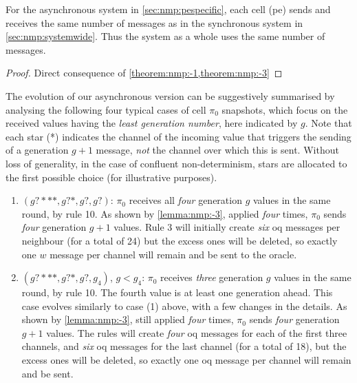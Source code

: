 \begin{theorem}\label{theorem:nmp:-4}
    For the asynchronous system in \cref{sec:nmp:pespecific}, 
    each cell (\gls{pe}) sends and receives the same number of messages as in the synchronous system in \cref{sec:nmp:systemwide}.   
    Thus the system as a whole uses the same number of messages.
\end{theorem}

\begin{proof}
    Direct consequence of \cref{theorem:nmp:-1,theorem:nmp:-3}
\end{proof}

\begin{remark}\label{remark:nmp:-2}
    The evolution of our asynchronous version can be suggestively summarised by
    analysing the following four typical cases of cell $\pi_0$ snapshots,
    which focus on the received values having the \emph{least generation number}, here indicated by $g$.
    Note that each star (*) indicates the channel of the incoming value 
    that triggers the sending of a generation $g+1$ message, 
    \emph{not} the channel over which this is sent.
    Without loss of generality, in the case of confluent non-determinism,
    stars are allocated to the first possible choice (for illustrative purposes).
    
    \begin{enumerate}
    \item $(g?***, g?*, g?, g?)$: 
    $\pi_0$ receives all \emph{four} generation $g$ values in the same round, by rule 10. 
    As shown by \cref{lemma:nmp:-3}, applied \emph{four} times, 
    $\pi_0$ sends \emph{four} generation $g+1$ values.
    Rule 3 will initially create \emph{six} \gls{oq} messages per neighbour (for a total of 24)
    but the excess ones will be deleted, so exactly one \(w\) message per channel will remain and be sent to the oracle.
    
    \medskip
    \item $(g?***, g?*, g?, g_4)$, $g < g_4$: 
    $\pi_0$ receives \emph{three} generation $g$ values in the same round, by rule 10.
    The fourth value is at least one generation ahead.    
    This case evolves similarly to case (1) above, with a few changes in the details.
    As shown by \cref{lemma:nmp:-3}, still applied \emph{four} times, 
    $\pi_0$ sends \emph{four} generation $g+1$ values.
    The rules will create \emph{four} \gls{oq} messages for each of the first three channels,
    and \emph{six} \gls{oq} messages for the last channel (for a total of 18),
    but the excess ones will be deleted, so exactly one \gls{oq} message per channel will remain and be sent.
    

\end{enumerate}
\end{remark}
